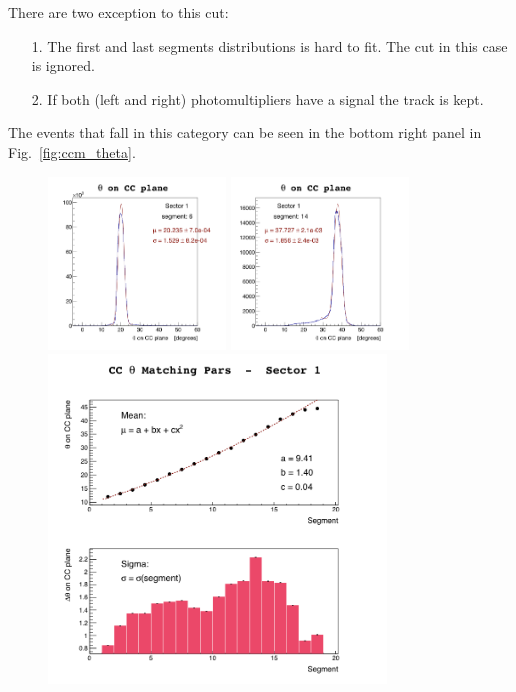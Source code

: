 There are two exception to this cut:
\begin{itemize}
 \item [1.] The first and last segments distributions is hard to fit. The cut in this case is ignored.
 \item [2.] If both (left and right) photomultipliers have a signal the track is kept.
\end{itemize}
The events that fall in this category can be seen in the bottom right panel in Fig.~\ref{fig:ccm_theta}.

\begin{figure}[ht]
  \centering
		\includegraphics[width=0.42\textwidth]{img/slice-06_cut-01ccthm_sector-1.png}
		\includegraphics[width=0.42\textwidth]{img/slice-14_cut-01ccthm_sector-1.png}
		\includegraphics[width=0.80\textwidth]{img/cut-01cctmpars_sector-1.png}

\end{figure}
